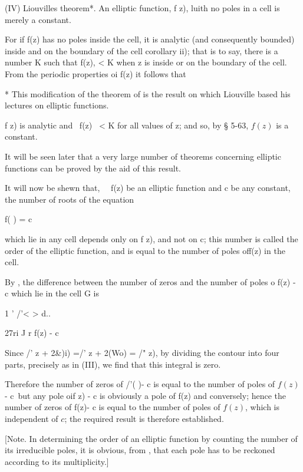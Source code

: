 (IV) Liouvilles theorem*. An elliptic function, f z), luith no poles
in a cell is merely a constant.

For if f(z) has no poles inside the cell, it is analytic (and
consequently bounded) inside and on the boundary of the cell 
corollary ii); that is to say, there is a number K such that f(z), <
K when z is inside or on the boundary of the cell. From the periodic
properties oi f(z) it follows that

* This modification of the theorem of  is the result on which
Liouville based his lectures on elliptic functions.

%
%

f z) is analytic and \ f(z) \ < K for all values of z; and so, by §
5-63, $f(z)$ is a constant.

It will be seen later that a very large number of theorems concerning
elliptic functions can be proved by the aid of this result.


It will now be shewn that, \ \ f(z) be an elliptic function and c be
any constant, the number of roots of the equation

f( ) = c

which lie in any cell depends only on f z), and not on c; this number
is called the order of the elliptic function, and is equal to the
number of poles off(z) in the cell.

By , the difference between the number of zeros and the number
of poles o f(z) - c which lie in the cell G is

1 ' /'< > d..

27ri J r f(z) - c

Since /' z + 2\&)i) =/' z + 2(Wo) = /" z), by dividing the contour
into four parts, precisely as in (III), we find that this
integral is zero.

Therefore the number of zeros of /'( )- c is equal to the number of
poles of $f(z)$ - c\ but any pole oif z) - c is obviously a pole of f(z)
and conversely; hence the number of zeros of f(z)- c is equal to the
number of poles of $f(z)$, which is independent of $c$; the required
result is therefore established.

[Note. In determining the order of an elliptic function by counting
the number of its irreducible poles, it is obvious, from , that
each pole has to be reckoned according to its multiplicity.]

